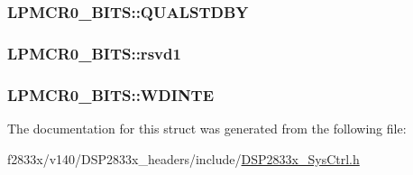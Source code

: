 \subsubsection[{Q\+U\+A\+L\+S\+T\+D\+B\+Y}]{ L\+P\+M\+C\+R0\+\_\+\+B\+I\+T\+S\+::\+Q\+U\+A\+L\+S\+T\+D\+B\+Y}\label{struct_l_p_m_c_r0___b_i_t_s_a4b57c1a9470af75c774798d18db0424b}
\hypertarget{struct_l_p_m_c_r0___b_i_t_s_aa0d1e76767df9dcf9f1f7edb4d67e825}{}
\subsubsection[{rsvd1}]{ L\+P\+M\+C\+R0\+\_\+\+B\+I\+T\+S\+::rsvd1}\label{struct_l_p_m_c_r0___b_i_t_s_aa0d1e76767df9dcf9f1f7edb4d67e825}
\hypertarget{struct_l_p_m_c_r0___b_i_t_s_ae02df05b44f6f2b89b927a500b80bf23}{}
\subsubsection[{W\+D\+I\+N\+T\+E}]{ L\+P\+M\+C\+R0\+\_\+\+B\+I\+T\+S\+::\+W\+D\+I\+N\+T\+E}\label{struct_l_p_m_c_r0___b_i_t_s_ae02df05b44f6f2b89b927a500b80bf23}


The documentation for this struct was generated from the following file\+:\begin{DoxyCompactItemize}
\item 
f2833x/v140/\+D\+S\+P2833x\+\_\+headers/include/\hyperlink{_d_s_p2833x___sys_ctrl_8h}{D\+S\+P2833x\+\_\+\+Sys\+Ctrl.\+h}\end{DoxyCompactItemize}
